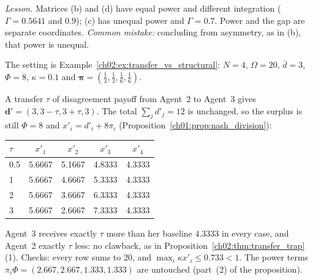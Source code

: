 \documentclass[../solutions_manual.tex]{subfiles}
\begin{document}
\emph{Lesson.} Matrices (b) and (d) have equal power and different integration ($\Gamma = 0.5641$ and $0.9$); (c) has unequal power and $\Gamma = 0.7$. Power and the gap are separate coordinates. \emph{Common mistake:} concluding from asymmetry, as in (b), that power is unequal.


The setting is Example~\ref{ch02:ex:transfer_vs_structural}: $N = 4$, $\Omega = 20$, $\bar d = 3$, $\Phi = 8$, $\kappa = 0.1$ and $\boldsymbol\pi = (\frac13, \frac13, \frac16, \frac16)$.

 A transfer $\tau$ of disagreement payoff from Agent~2 to Agent~3 gives $\mathbf d' = (3, 3 - \tau, 3 + \tau, 3)$. The total $\sum_j d'_j = 12$ is unchanged, so the surplus is still $\Phi = 8$ and $x'_i = d'_i + 8\pi_i$ (Proposition~\ref{ch01:prop:nash_division}):
\begin{center}
\begin{tabular}{lcccc}
\toprule
$\tau$ & $x'_1$ & $x'_2$ & $x'_3$ & $x'_4$ \\
\midrule
0.5 & 5.6667 & 5.1667 & 4.8333 & 4.3333 \\
1   & 5.6667 & 4.6667 & 5.3333 & 4.3333 \\
2   & 5.6667 & 3.6667 & 6.3333 & 4.3333 \\
3   & 5.6667 & 2.6667 & 7.3333 & 4.3333 \\
\bottomrule
\end{tabular}
\end{center}
Agent~3 receives exactly $\tau$ more than her baseline $4.3333$ in every case, and Agent~2 exactly $\tau$ less: no clawback, as in Proposition~\ref{ch02:thm:transfer_trap}(1). Checks: every row sums to 20, and $\max_i\kappa x'_i \le 0.733 < 1$. The power terms $\pi_i\Phi = (2.667, 2.667, 1.333, 1.333)$ are untouched (part~(2) of the proposition).
\end{document}
